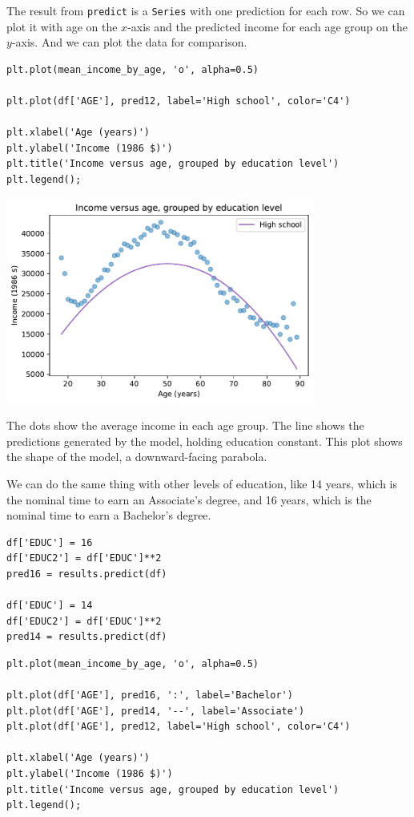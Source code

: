 The result from \passthrough{\lstinline!predict!} is a
\passthrough{\lstinline!Series!} with one prediction for each row. So we
can plot it with age on the \(x\)-axis and the predicted income for each
age group on the \(y\)-axis. And we can plot the data for comparison.

\begin{lstlisting}[]
plt.plot(mean_income_by_age, 'o', alpha=0.5)

plt.plot(df['AGE'], pred12, label='High school', color='C4')

plt.xlabel('Age (years)')
plt.ylabel('Income (1986 $)')
plt.title('Income versus age, grouped by education level')
plt.legend();
\end{lstlisting}

\begin{center}
\includegraphics[width=4in]{chapters/10_regression_files/10_regression_53_0.pdf}
\end{center}

The dots show the average income in each age group. The line shows the
predictions generated by the model, holding education constant. This
plot shows the shape of the model, a downward-facing parabola.

We can do the same thing with other levels of education, like 14 years,
which is the nominal time to earn an Associate's degree, and 16 years,
which is the nominal time to earn a Bachelor's degree.

\begin{lstlisting}[]
df['EDUC'] = 16
df['EDUC2'] = df['EDUC']**2
pred16 = results.predict(df)

df['EDUC'] = 14
df['EDUC2'] = df['EDUC']**2
pred14 = results.predict(df)
\end{lstlisting}

\begin{lstlisting}[]
plt.plot(mean_income_by_age, 'o', alpha=0.5)

plt.plot(df['AGE'], pred16, ':', label='Bachelor')
plt.plot(df['AGE'], pred14, '--', label='Associate')
plt.plot(df['AGE'], pred12, label='High school', color='C4')

plt.xlabel('Age (years)')
plt.ylabel('Income (1986 $)')
plt.title('Income versus age, grouped by education level')
plt.legend();
\end{lstlisting}

